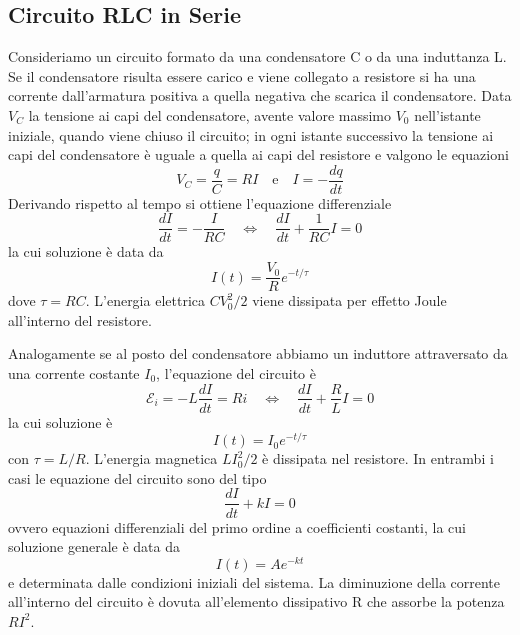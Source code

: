 \subsection{Circuito RLC in Serie}

Consideriamo un circuito formato da una condensatore C o da una induttanza L. Se il condensatore risulta essere carico e viene collegato a resistore si ha una corrente dall'armatura positiva a quella negativa che scarica il condensatore. Data $V_C$ la tensione ai capi del condensatore, avente valore massimo $V_0$ nell'istante iniziale, quando viene chiuso il circuito; in ogni istante successivo la tensione ai capi del condensatore \`e uguale a quella ai capi del resistore e valgono le equazioni 
\begin{equation*}
	V_C = \frac{q}{C} = RI \quad \text{e} \quad I = - \frac{dq}{dt}
\end{equation*}  
Derivando rispetto al tempo si ottiene l'equazione differenziale  
\begin{equation*}
	\frac{dI}{dt} = - \frac{I}{RC} \quad \iff \quad  \frac{dI}{dt} + \frac{1}{RC}I = 0
\end{equation*}
la cui soluzione \`e data da
\begin{equation*}
	I(t) = \frac{V_0}{R} e^{- t/\tau}
\end{equation*}
dove $\tau =RC$. L'energia elettrica $CV_0^2/2$ viene dissipata per effetto Joule all'interno del resistore.
\newline

Analogamente se al posto del condensatore abbiamo un induttore attraversato da una corrente  costante $I_0$, l'equazione del circuito \`e 
\begin{equation*}
	\mathcal{E}_i = -L \frac{d I}{dt} = Ri \quad \iff \quad \frac{dI}{dt} + \frac{R}{L}I = 0
\end{equation*}
la cui soluzione \`e 
\begin{equation*}
	I(t) = I_0 e^{-t/\tau}
\end{equation*}
con $\tau = L/R$. L'energia magnetica $L I_0^2/2$ \`e dissipata nel resistore. In entrambi i casi le equazione del circuito sono del tipo
\begin{equation*}
	\frac{dI}{dt}+kI = 0
\end{equation*}
ovvero equazioni differenziali del primo ordine a coefficienti costanti, la cui soluzione generale \`e data da
\begin{equation*}
	I(t) = A e^{-kt}
\end{equation*}
e determinata dalle condizioni iniziali del sistema. La diminuzione della corrente all'interno del circuito \`e dovuta all'elemento dissipativo R che assorbe la potenza $RI^2$.

